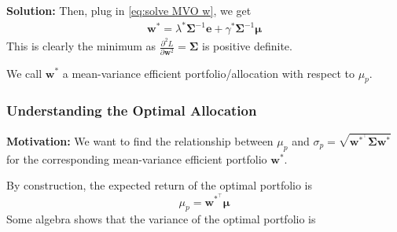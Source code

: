 \documentclass[13pt]{article}
\theoremstyle{definition}
\newenvironment{solution}
{\color{C2}\begin{framed}\begingroup\textbf{Solution:} }
  {\endgroup\end{framed}}
\theoremstyle{remark}
\begin{document}
\begin{solution}
Then, plug in \cref{eq:solve MVO w}, we get
\begin{align}
\bm{w}^*=\lambda^*\mathbf{\Sigma}^{-1}\bm{e}+\gamma^*\mathbf{\Sigma}^{-1}\bm{\mu}\label{eq:optimal weight MVO}
\end{align}
This is clearly the minimum as $\frac{\partial^{2} L}{\partial \bm{w}^{2}}=\mathbf{\Sigma}$ is positive definite.

We call $\bm{w}^{*}$ a mean-variance efficient portfolio/allocation with respect to $\mu_p$.
\end{solution}

\subsubsection{Understanding the Optimal Allocation}
{\color{C6}\textbf{Motivation:} We want to find the relationship between $\mu_p$ and $\sigma_p=\sqrt{\bm{w}^{*^\top} \mathbf{\Sigma}\bm{w}^{*}}$ for the corresponding mean-variance efficient portfolio $\bm{w}^{*}$.}

By construction, the expected return of the optimal portfolio is
$$
\mu_{p}=\bm{w}^{*^\top} \bm{\mu}
$$
Some algebra shows that the variance of the optimal portfolio is
\end{document}
